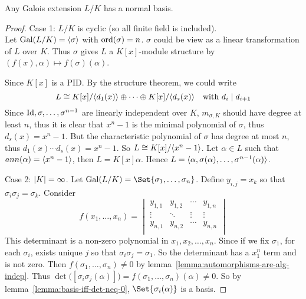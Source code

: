 \begin{theorem}
  Any Galois extension $L/K$ has a normal basis.

  \begin{proof}
    Case 1: $L/K$ is cyclic (so all finite field is included). \\
    Let $\operatorname{Gal}(L/K) = \langle \sigma \rangle$ with $\operatorname{ord}(\sigma) = n$. $\sigma$ could be view as
    a linear transformation of $L$ over $K$. Thus $\sigma$ gives $L$ a
    $K[x]$-module structure by $(f(x), \alpha) \mapsto f(\sigma)(\alpha)$.

    Since $K[x]$ is a PID. By the structure theorem, we could write
    \[ L \cong {K[x]}/{\langle d_1(x)\rangle} \oplus \dots \oplus {K[x]}/{\langle d_s(x)\rangle} \quad
      \text{with } d_i \mid d_{i+1} \]
    Since ${\rm Id}, \sigma, \dots, \sigma^{n-1}$ are linearly independent over $K$,
    $m_{\sigma, K}$ should have degree at least $n$, thus it is clear that $x^n - 1$
    is the minimal polynomial of $\sigma$, thus $d_s(x) = x^n - 1$. But
    the characteristic polynomial of $\sigma$ has degree at most $n$, thus
    $d_1(x) \dotsm d_s(x) = x^n - 1$. So $L \cong K[x] / \langle x^n - 1\rangle$.
    Let $\alpha \in L$ such that $ann(\alpha) = \langle x^n - 1\rangle$, then $L = K[x]\alpha$.
    Hence $L = \langle\alpha, \sigma(\alpha), \dots, \sigma^{n-1}(\alpha)\rangle$.

    Case 2: $\lvert K\rvert = \infty$. Let $\Gal(L/K) = \Set{\sigma_1, \dots, \sigma_n}$.
    Define $y_{i, j} = x_k$ so that $\sigma_i \sigma_j = \sigma_{k}$.
    Consider
  \[
    f(x_1, \dots, x_n) = \begin{vmatrix}
      y_{1, 1} & y_{1, 2} & \cdots & y_{1, n} \\
      \vdots & \ddots & \vdots & \vdots \\
      y_{n, 1} & y_{n, 2} & \cdots & y_{n, n} \\
    \end{vmatrix}
  \]
  This determinant is a non-zero polynomial in $x_1, x_2, \dots, x_n$.
  Since if we fix $\sigma_1$, for each $\sigma_i$, exists unique $j$ so that $\sigma_i \sigma_j = \sigma_1$.
  So the determinant has a $x_1^n$ term and is not zero.
  Then $f(\sigma_1, \dots, \sigma_n) \neq 0$ by lemma~\ref{lemma:automorphisms-are-alg-indep}.
  Thus $\det\big([\sigma_{i}\sigma_{j}(\alpha)] \big) = f(\sigma_1, \dots, \sigma_n)(\alpha) \neq 0$.
  So by lemma~\ref{lemma:basis-iff-det-neq-0}, $\Set{ \sigma_i(\alpha) }$ is a basis.

  \end{proof}
\end{theorem}
